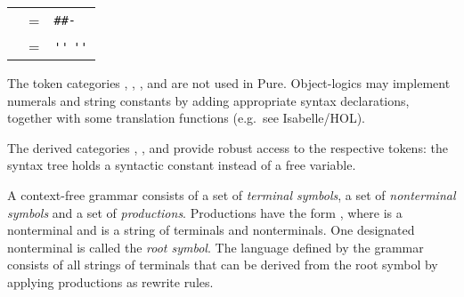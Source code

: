 \begin{isabellebody}
\begin{isamarkuptext}
\begin{center}
\begin{supertabular}{rcl}
    \hypertarget{syntax.inner.xnum-token}{\hyperlink{syntax.inner.xnum-token}{\mbox{}}} & = & \verb|#|\hyperlink{syntax.nat}{\mbox{}}\verb|#-|\hyperlink{syntax.nat}{\mbox{}} \\

    \hypertarget{syntax.inner.xstr}{\hyperlink{syntax.inner.xstr}{\mbox{}}} & = & \verb|''|  \verb|''| \\
  \end{supertabular}
  \end{center}

  The token categories \hyperlink{syntax.inner.num-token}{\mbox{}}, \hyperlink{syntax.inner.float-token}{\mbox{}}, \hyperlink{syntax.inner.xnum-token}{\mbox{}}, and \hyperlink{syntax.inner.xstr}{\mbox{}} are not used in Pure.  Object-logics may implement numerals
  and string constants by adding appropriate syntax declarations,
  together with some translation functions (e.g.\ see Isabelle/HOL).

  The derived categories \hypertarget{syntax.inner.num-const}{\hyperlink{syntax.inner.num-const}{\mbox{}}}, \hypertarget{syntax.inner.float-const}{\hyperlink{syntax.inner.float-const}{\mbox{}}}, and \hypertarget{syntax.inner.num-const}{\hyperlink{syntax.inner.num-const}{\mbox{}}} provide
  robust access to the respective tokens: the syntax tree holds a
  syntactic constant instead of a free variable.%
\end{isamarkuptext}%
\isamarkuptrue%
%
\isamarkuptrue%
%
\begin{isamarkuptext}%
A context-free grammar consists of a set of \emph{terminal
  symbols}, a set of \emph{nonterminal symbols} and a set of
  \emph{productions}.  Productions have the form ,
  where  is a nonterminal and  is a string of
  terminals and nonterminals.  One designated nonterminal is called
  the \emph{root symbol}.  The language defined by the grammar
  consists of all strings of terminals that can be derived from the
  root symbol by applying productions as rewrite rules.


\end{isamarkuptext}
\end{isabellebody}
